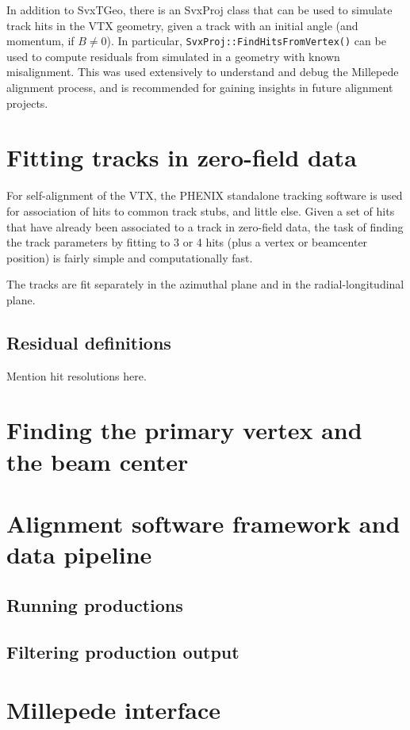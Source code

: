 \documentclass{article}
\begin{document}
In addition to SvxTGeo, there is an SvxProj class that can be used to simulate track hits in the VTX geometry, given a track with an initial angle (and momentum, if $B \neq 0$). In particular, \texttt{SvxProj::FindHitsFromVertex()} can be used to compute residuals from simulated in a geometry with known misalignment. This was used extensively to understand and debug the Millepede alignment process, and is recommended for gaining insights in future alignment projects.

\section{Fitting tracks in zero-field data}
For self-alignment of the VTX, the PHENIX standalone tracking software is used for association of hits to common track stubs, and little else. Given a set of hits that have already been associated to a track in zero-field data, the task of finding the track parameters by fitting to 3 or 4 hits (plus a vertex or beamcenter position) is fairly simple and computationally fast.

The tracks are fit separately in the azimuthal plane and in the radial-longitudinal plane.


\subsection{Residual definitions}
Mention hit resolutions here.
\section{Finding the primary vertex and the beam center}

\section{Alignment software framework and data pipeline}
\subsection{Running productions}
\subsection{Filtering production output}
\section{Millepede interface}
\end{document}
